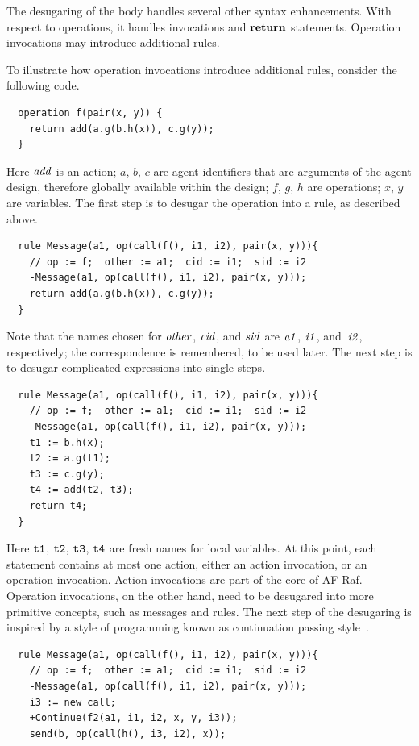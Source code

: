 \documentclass[a4paper,12pt,oneside,fleqn]{book} %
\begin{document}
{The desugaring of the body handles several other syntax enhancements. With
respect to operations, it handles invocations and $\bf return$ statements.
Operation invocations may introduce additional rules.

\begin{example}
To illustrate how operation invocations introduce additional rules,
consider the following code.
\begin{verbatim}
  operation f(pair(x, y)) {
    return add(a.g(b.h(x)), c.g(y));
  }
\end{verbatim}
Here $\it add$ is an action; $a$, $b$, $c$ are agent identifiers that are
arguments of the agent design, therefore globally available within the
design; $f$, $g$, $h$ are operations; $x$, $y$ are variables. The first
step is to desugar the operation into a rule, as described above.
\begin{verbatim}
  rule Message(a1, op(call(f(), i1, i2), pair(x, y))){
    // op := f;  other := a1;  cid := i1;  sid := i2
    -Message(a1, op(call(f(), i1, i2), pair(x, y)));
    return add(a.g(b.h(x)), c.g(y));
  }
\end{verbatim}
Note that the names chosen for $\it other$, $\it cid$, and $\it sid$ are
$\it a1$, $\it i1$, and~$\it i2$, respectively; the correspondence is
remembered, to be used later.  The next step is to desugar complicated
expressions into single steps.
\begin{verbatim}
  rule Message(a1, op(call(f(), i1, i2), pair(x, y))){
    // op := f;  other := a1;  cid := i1;  sid := i2
    -Message(a1, op(call(f(), i1, i2), pair(x, y)));
    t1 := b.h(x);
    t2 := a.g(t1);
    t3 := c.g(y);
    t4 := add(t2, t3);
    return t4;
  }
\end{verbatim}
Here $\tt t1$, $\tt t2$, $\tt t3$, $\tt t4$ are fresh names for local
variables. At this point, each statement contains at most one action,
either an action invocation, or an operation invocation. Action invocations
are part of the core of AF-Raf. Operation invocations, on the other hand,
need to be desugared into more primitive concepts, such as messages and
rules. The next step of the desugaring is inspired by a style of
programming known as continuation passing
style~\cite{DBLP:conf/popl/AppelJ89}.
\begin{verbatim}
  rule Message(a1, op(call(f(), i1, i2), pair(x, y))){
    // op := f;  other := a1;  cid := i1;  sid := i2
    -Message(a1, op(call(f(), i1, i2), pair(x, y)));
    i3 := new call;
    +Continue(f2(a1, i1, i2, x, y, i3));
    send(b, op(call(h(), i3, i2), x));

\end{verbatim}
\end{example}}
\end{document}
